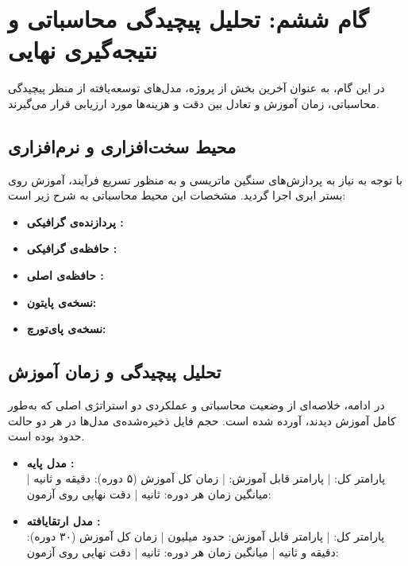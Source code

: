 \section{گام ششم: تحلیل پیچیدگی محاسباتی و نتیجه‌گیری نهایی}

در این گام، به عنوان آخرین بخش از پروژه، مدل‌های توسعه‌یافته از منظر پیچیدگی محاسباتی، زمان آموزش و تعادل بین دقت و هزینه‌ها مورد ارزیابی قرار می‌گیرند.

\subsection{محیط سخت‌افزاری و نرم‌افزاری}
با توجه به نیاز به پردازش‌های سنگین ماتریسی و به منظور تسریع فرآیند، آموزش روی بستر ابری  اجرا گردید. مشخصات این محیط محاسباتی به شرح زیر است:
\begin{itemize}
    \item \textbf{پردازنده‌ی گرافیکی :} 
    \item \textbf{حافظه‌ی گرافیکی :} 
    \item \textbf{حافظه‌ی اصلی :} 
    \item \textbf{نسخه‌ی پایتون:} 
    \item \textbf{نسخه‌ی پای‌تورچ:} 
\end{itemize}

\subsection{تحلیل پیچیدگی و زمان آموزش}
در ادامه، خلاصه‌ای از وضعیت محاسباتی و عملکردی دو استراتژی اصلی که به‌طور کامل آموزش دیدند، آورده شده است. حجم فایل ذخیره‌شده‌ی مدل‌ها در هر دو حالت حدود  بوده است.

\begin{itemize}
    \item \textbf{مدل پایه :} \\
    پارامتر کل:  | پارامتر قابل آموزش:  | زمان کل آموزش (۵ دوره):  دقیقه و  ثانیه | میانگین زمان هر دوره:  ثانیه | دقت نهایی روی آزمون:  
    
    \item \textbf{مدل ارتقایافته :} \\
    پارامتر کل:  | پارامتر قابل آموزش: حدود  میلیون | زمان کل آموزش (۳۰ دوره):  دقیقه و  ثانیه | میانگین زمان هر دوره:  ثانیه | دقت نهایی روی آزمون:  
\end{itemize}
\newpage
